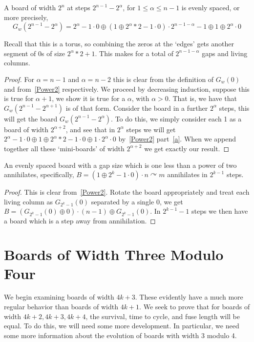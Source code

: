 \documentclass[12pt,letterpaper]{article}
\begin{document}
\begin{prop}\label{Pow2BelowPow2EvenSpacing}
  A board of width $2^n$ at steps $2^{n-1}-2^\alpha$, for $1\leq \alpha\leq n-1$ is evenly spaced, or more precisely,
  \[ G_w(2^{n-1}-2^\alpha)=2^\alpha-1\cdot 0 \oplus (1\oplus 2^\alpha*2-1\cdot 0)\cdot 2^{n-1-\alpha}-1 \oplus 1\oplus 2^\alpha\cdot 0 \]
\end{prop}
\begin{remark}
  Recall that this is a torus, so combining the zeros at the `edges' gets another segment of 0s of size $2^\alpha*2+1$. This makes for a total of $2^{n-1-\alpha}$ gaps and living columns.
\end{remark}
\begin{proof}
  For $\alpha=n-1$ and $\alpha=n-2$ this is clear from the definition of $G_w(0)$ and from~\cref{Power2} respectively. We proceed by decreasing induction, suppose this is true for $\alpha+1$, we show it is true for a $\alpha$, with $\alpha>0$. That is, we have that $G_w(2^{n-1}-2^{\alpha+1})$ is of that form. Consider the board in a further $2^\alpha$ steps, this will get the board $G_w(2^{n-1}-2^\alpha)$. To do this, we simply consider each 1 as a board of width $2^{\alpha+2}$, and see that in $2^\alpha$ steps we will get $2^\alpha-1\cdot 0 \oplus 1\oplus 2^\alpha*2-1\cdot 0\oplus 1\cdot 2^\alpha\cdot 0$ by~\cref{Power2} part~\ref{a}. When we append together all these `mini-boards' of width $2^{\alpha+2}$ we get exactly our result.
\end{proof}

\begin{prop}\label{EvenlySpacedPow2Annihilation}
  An evenly spaced board with a gap size which is one less than a power of two annihilates, specifically, $B = (1\oplus 2^k-1\cdot 0)\cdot n \curvearrowright m$ annihilates in $2^{k-1}$ steps.
\end{prop}
\begin{proof}
  This is clear from~\cref{Power2}. Rotate the board appropriately and treat each living column as $G_{2^k-1}(0)$ separated by a single 0, we get $B=(G_{2^k-1}(0)\oplus 0)\cdot (n-1)\oplus G_{2^k-1}(0)$. In $2^{k-1}-1$ steps we then have a board which is a step away from annihilation.
\end{proof}

\section{Boards of Width Three Modulo Four}
We begin examining boards of width $4k+3$. These evidently have a much more regular behavior than boards of width $4k+1$. 
We seek to prove that for boards of width $4k+2, 4k+3, 4k+4$, the survival, time to cycle, and fuse length will be equal. To do this, we will need some more development. In particular, we need some more information about the evolution of boards with width 3 modulo 4.
\end{document}
